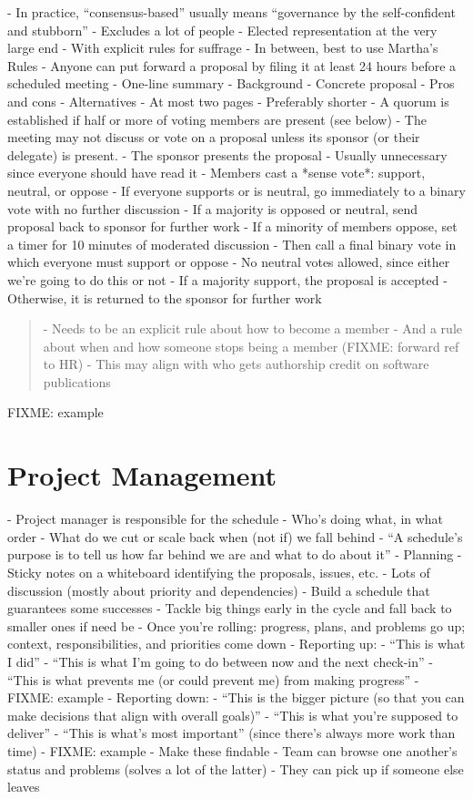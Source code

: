 \documentclass[10pt,letterpaper]{article}
\begin{document}
- In practice, ``consensus-based'' usually means ``governance by the self-confident and stubborn''
  - Excludes a lot of people
- Elected representation at the very large end
  - With explicit rules for suffrage
- In between, best to use Martha's Rules \cite{Minahan1986}
- Anyone can put forward a proposal by filing it at least 24 hours before a scheduled meeting
  - One-line summary
  - Background
  - Concrete proposal
  - Pros and cons
  - Alternatives
- At most two pages
  - Preferably shorter
- A quorum is established if half or more of voting members are present (see below)
- The meeting may not discuss or vote on a proposal unless its sponsor (or their delegate) is present.
- The sponsor presents the proposal
  - Usually unnecessary since everyone should have read it
- Members cast a *sense vote*: support, neutral, or oppose
  - If everyone supports or is neutral, go immediately to a binary vote with no further discussion
  - If a majority is opposed or neutral, send proposal back to sponsor for further work
- If a minority of members oppose, set a timer for 10 minutes of moderated discussion
- Then call a final binary vote in which everyone must support or oppose
  - No neutral votes allowed, since either we're going to do this or not
- If a majority support, the proposal is accepted
  - Otherwise, it is returned to the sponsor for further work

\begin{quotation}
- Needs to be an explicit rule about how to become a member
  - And a rule about when and how someone stops being a member (FIXME: forward ref to HR)
- This may align with who gets authorship credit on software publications
\end{quotation}

FIXME: example

\section{Project Management}

- Project manager is responsible for the schedule
  - Who's doing what, in what order
  - What do we cut or scale back when (not if) we fall behind
  - ``A schedule's purpose is to tell us how far behind we are and what to do about it''
- Planning
  - Sticky notes on a whiteboard identifying the proposals, issues, etc.
  - Lots of discussion (mostly about priority and dependencies)
- Build a schedule that guarantees some successes
  - Tackle big things early in the cycle and fall back to smaller ones if need be
- Once you're rolling: progress, plans, and problems go up; context, responsibilities, and priorities come down
- Reporting up:
  - ``This is what I did''
  - ``This is what I'm going to do between now and the next check-in''
  - ``This is what prevents me (or could prevent me) from making progress''
  - FIXME: example
- Reporting down:
  - ``This is the bigger picture (so that you can make decisions that align with overall goals)''
  - ``This is what you're supposed to deliver''
  - ``This is what's most important'' (since there's always more work than time)
  - FIXME: example
- Make these findable \cite{Lin2020}
  - Team can browse one another's status and problems (solves a lot of the latter)
  - They can pick up if someone else leaves
\end{document}
